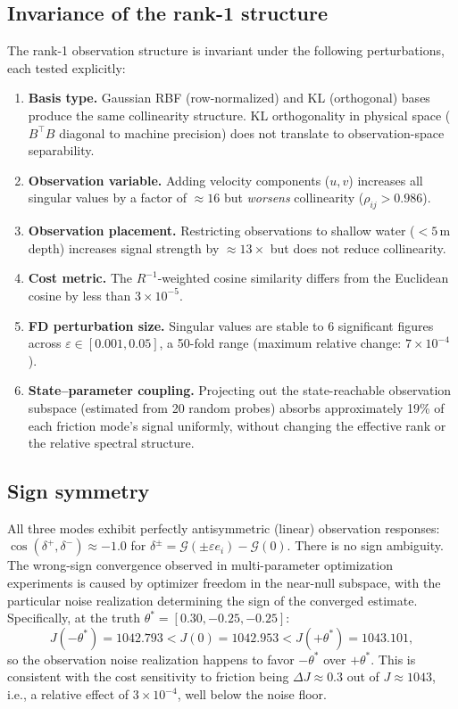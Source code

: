 \documentclass[11pt]{article}
\theoremstyle{definition}
\begin{document}
\subsection{Invariance of the rank-1 structure}

The rank-1 observation structure is invariant under the following
perturbations, each tested explicitly:
\begin{enumerate}
\item \textbf{Basis type.} Gaussian RBF (row-normalized) and KL
  (orthogonal) bases produce the same collinearity structure.
  KL orthogonality in physical space ($B^\top B$ diagonal to
  machine precision) does not translate to observation-space
  separability.

\item \textbf{Observation variable.} Adding velocity components
  ($u,v$) increases all singular values by a factor of $\approx 16$
  but \emph{worsens} collinearity ($\rho_{ij} > 0.986$).

\item \textbf{Observation placement.} Restricting observations to
  shallow water ($< 5\,$m depth) increases signal strength by
  $\approx 13\times$ but does not reduce collinearity.

\item \textbf{Cost metric.} The $R^{-1}$-weighted cosine similarity
  differs from the Euclidean cosine by less than $3 \times 10^{-5}$.

\item \textbf{FD perturbation size.} Singular values are stable to
  6 significant figures across $\varepsilon \in [0.001, 0.05]$,
  a 50-fold range (maximum relative change: $7 \times 10^{-4}$).

\item \textbf{State--parameter coupling.} Projecting out the
  state-reachable observation subspace (estimated from 20 random
  probes) absorbs approximately 19\% of each friction mode's signal
  uniformly, without changing the effective rank or the relative
  spectral structure.
\end{enumerate}

\subsection{Sign symmetry}

All three modes exhibit perfectly antisymmetric (linear) observation
responses: $\cos(\delta^+, \delta^-) \approx -1.0$ for
$\delta^\pm = \mathcal{G}(\pm\varepsilon e_i) - \mathcal{G}(0)$.
There is no sign ambiguity.  The wrong-sign convergence observed in
multi-parameter optimization experiments is caused by optimizer
freedom in the near-null subspace, with the particular noise
realization determining the sign of the converged estimate.
Specifically, at the truth $\theta^* = [0.30, -0.25, -0.25]$:
\[
J(-\theta^*) = 1042.793 < J(0) = 1042.953 < J(+\theta^*) = 1043.101,
\]
so the observation noise realization happens to favor $-\theta^*$
over $+\theta^*$.  This is consistent with the cost sensitivity to
friction being $\Delta J \approx 0.3$ out of $J \approx 1043$, i.e.,
a relative effect of $3 \times 10^{-4}$, well below the noise floor.
\end{document}
